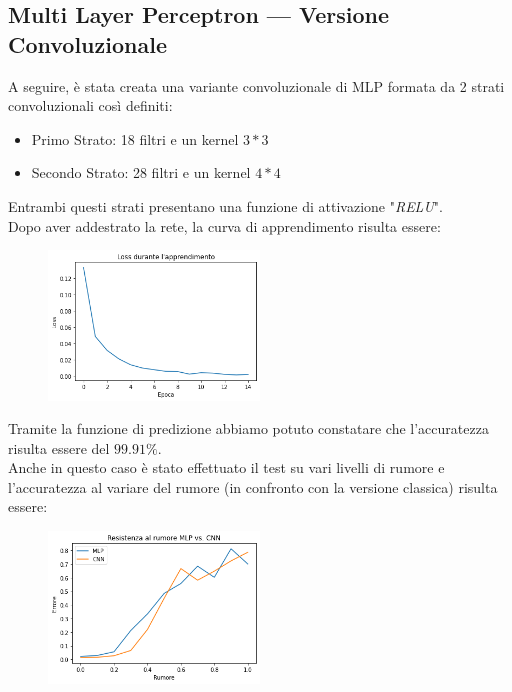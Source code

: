 \documentclass[12pt, a4paper]{article}
\begin{document}
\subsection{Multi Layer Perceptron --- Versione Convoluzionale}
A seguire, è stata creata una variante convoluzionale di MLP formata da 2 strati convoluzionali così definiti:
\begin{itemize}
    \item Primo Strato: 18 filtri e un kernel \(3*3\)
    \item Secondo Strato: 28 filtri e un kernel \(4*4\)
\end{itemize}
Entrambi questi strati presentano una funzione di attivazione "\textit{RELU}".\\
Dopo aver addestrato la rete, la curva di apprendimento risulta essere:
\begin{figure}[H]
    \centering
    \includegraphics[width=0.50\textwidth]{Curva_Conv.png}
\end{figure}
Tramite la funzione di predizione abbiamo potuto constatare che l'accuratezza risulta essere del \(99.91\%\).\\
Anche in questo caso è stato effettuato il test su vari livelli di rumore e l'accuratezza al variare del rumore (in confronto con la versione classica) risulta essere:
\begin{figure}[H]
    \centering
    \includegraphics[width=0.50\textwidth]{Rumore_Conv.png}
\end{figure}
\end{document}
